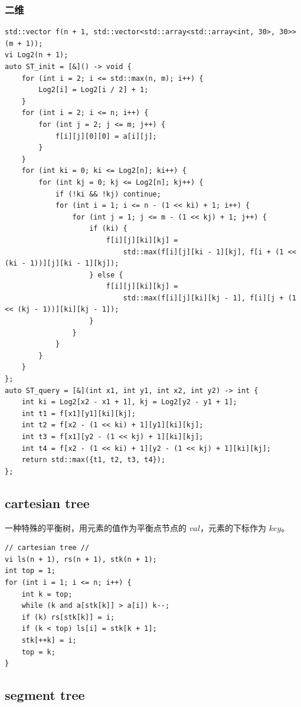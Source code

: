 \documentclass[UTF8, a4paper, titlepage, twoside]{ctexart}
\begin{document}
\subsubsection*{ 二维 }
\begin{lstlisting}[style=cpp]
std::vector f(n + 1, std::vector<std::array<std::array<int, 30>, 30>>(m + 1));
vi Log2(n + 1);
auto ST_init = [&]() -> void {
    for (int i = 2; i <= std::max(n, m); i++) {
        Log2[i] = Log2[i / 2] + 1;
    }
    for (int i = 2; i <= n; i++) {
        for (int j = 2; j <= m; j++) {
            f[i][j][0][0] = a[i][j];
        }
    }
    for (int ki = 0; ki <= Log2[n]; ki++) {
        for (int kj = 0; kj <= Log2[n]; kj++) {
            if (!ki && !kj) continue;
            for (int i = 1; i <= n - (1 << ki) + 1; i++) {
                for (int j = 1; j <= m - (1 << kj) + 1; j++) {
                    if (ki) {
                        f[i][j][ki][kj] =
                            std::max(f[i][j][ki - 1][kj], f[i + (1 << (ki - 1))][j][ki - 1][kj]);
                    } else {
                        f[i][j][ki][kj] =
                            std::max(f[i][j][ki][kj - 1], f[i][j + (1 << (kj - 1))][ki][kj - 1]);
                    }
                }
            }
        }
    }
};
auto ST_query = [&](int x1, int y1, int x2, int y2) -> int {
    int ki = Log2[x2 - x1 + 1], kj = Log2[y2 - y1 + 1];
    int t1 = f[x1][y1][ki][kj];
    int t2 = f[x2 - (1 << ki) + 1][y1][ki][kj];
    int t3 = f[x1][y2 - (1 << kj) + 1][ki][kj];
    int t4 = f[x2 - (1 << ki) + 1][y2 - (1 << kj) + 1][ki][kj];
    return std::max({t1, t2, t3, t4});
};
\end{lstlisting}

\subsection{ cartesian tree }
一种特殊的平衡树，用元素的值作为平衡点节点的 $val$，元素的下标作为 $key$。

\begin{lstlisting}[style=cpp]
// cartesian tree //
vi ls(n + 1), rs(n + 1), stk(n + 1);
int top = 1;
for (int i = 1; i <= n; i++) {
    int k = top;
    while (k and a[stk[k]] > a[i]) k--;
    if (k) rs[stk[k]] = i;
    if (k < top) ls[i] = stk[k + 1];
    stk[++k] = i;
    top = k;
}
\end{lstlisting}

\subsection{ segment tree }
\end{document}
